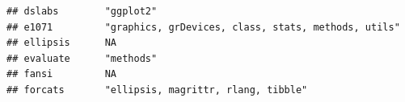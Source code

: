 \documentclass[]{article}
\begin{document}
\begin{verbatim}
## dslabs        "ggplot2"                                                                                                                                                                                                                                                                                                                                                                                                                                                                             
## e1071         "graphics, grDevices, class, stats, methods, utils"                                                                                                                                                                                                                                                                                                                                                                                                                                   
## ellipsis      NA                                                                                                                                                                                                                                                                                                                                                                                                                                                                                    
## evaluate      "methods"                                                                                                                                                                                                                                                                                                                                                                                                                                                                             
## fansi         NA                                                                                                                                                                                                                                                                                                                                                                                                                                                                                    
## forcats       "ellipsis, magrittr, rlang, tibble"                                                                                                                                                                                                                                                                                                                                                                                                                                                   

\end{verbatim}
\end{document}
